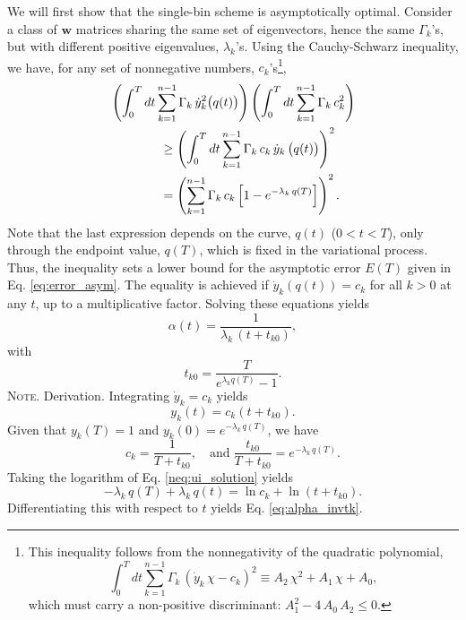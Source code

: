 \documentclass[reprint, superscriptaddress, floatfix]{revtex4-1}
\newcommand{\note}[1]{{\color{DarkGreen}\footnotesize \textsc{Note.} #1}}
\newcommand{\Err}{E}
\begin{document}
We will first show
that the single-bin scheme is asymptotically optimal.
%
Consider a class of $\mathbf w$ matrices
sharing the same set of eigenvectors,
hence the same $\Gamma_k$'s,
but with different positive eigenvalues,
$\lambda_k$'s.
%
Using the Cauchy-Schwarz inequality, we have,
for any set of nonnegative numbers, $c_k$'s\footnote{This
inequality follows from the nonnegativity of
the quadratic polynomial,
$$
\int_0^T
  dt \sum_{k = 1}^{n-1} \Gamma_k \,
    \left( {\dot y}_k \, \chi - c_k \right)^2
  \equiv
  A_2 \, \chi^2 + A_1 \, \chi + A_0
  ,
$$
which must carry a non-positive discriminant:
$A_1^2 - 4 \, A_0 \, A_2 \le 0$.},
%
%
\begin{align}
&
\left(
  \int_0^T dt
    \sum_{k = 1}^{n-1}
      \Gamma_k \, {\dot y}_k^2\bigl( q(t) \bigr)
\right)
%
\left(
  \int_0^T dt
    \sum_{k = 1}^{n-1}
      \Gamma_k \, c_k^2
\right)
%
\notag
\\
&
\qquad \qquad
\ge
\left(
  \int_0^T dt
    \sum_{k = 1}^{n-1}
      \Gamma_k \, c_k \, {\dot y}_k \, \bigl( q(t) \bigr)
\right)^2
\notag
\\
&
\qquad \qquad
=
\left(
  \sum_{k = 1}^{n-1} \Gamma_k \, c_k
    \left[
      1 - e^{ -\lambda_k \, q(T) }
    \right]
\right)^2.
\label{eq:CSineq}
\end{align}
%
Note that the last expression %
depends on the curve, $q(t)$ ($0 < t < T$),
only through the endpoint value, $q(T)$,
which is fixed in the variational process.
%
Thus, the inequality sets a lower bound
for the asymptotic error $\Err(T)$
given in Eq. \eqref{eq:error_asym}.
%
The equality is achieved
if $\dot y_k\left( q(t) \right) = c_k$
for all $k > 0$ at any $t$,
up to a multiplicative factor.
%
Solving these equations yields
%
\begin{equation}
  \alpha(t) = \frac{              1             }
                   { \lambda_k \, (t + t_{k0} ) },
\label{eq:alpha_invtk}
\end{equation}
with
\begin{equation}
  t_{k0} = \frac{             T            }
                { e^{ \lambda_k q(T) } - 1 }.
\label{eq:tk0}
\end{equation}
%
\note{Derivation.
  Integrating $\dot y_k = c_k$ yields
  \begin{equation}
    y_k(t) = c_k \left(t + t_{k0} \right).
  \tag{UK}
  \label{neq:ui_solution}
  \end{equation}
  Given that $y_k(T) = 1$ and $y_k(0) = e^{-\lambda_k \, q(T)}$,
  we have
  $$
  c_k = \frac{ 1 }{ T + t_{k0} },
  \quad
  \mathrm{and\;}
  \frac{ t_{k0} } { T + t_{k0} }
  =
  e^{ -\lambda_k \, q(T) }.
  $$
  Taking the logarithm of Eq. \eqref{neq:ui_solution} yields
  $$
  -\lambda_k \, q(T) + \lambda_k \, q(t)
  = \ln c_k + \ln \left( t + t_{k0} \right).
  $$
  Differentiating this with respect to $t$ yields
  Eq. \eqref{eq:alpha_invtk}.
}
\end{document}
